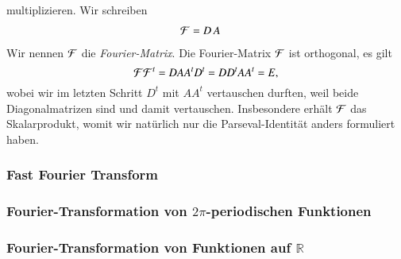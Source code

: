 multiplizieren.
Wir schreiben
\begin{align*}
{\cal F}
&=
D\, A
\end{align*}
Wir nennen $\cal F$ die {\em Fourier-Matrix}.
%
Die Fourier-Matrix $\cal F$ ist orthogonal, es gilt
\[
{\cal F}{\cal F}^t
=
DAA^tD^t
=
DD^tAA^t
=
E,
\]
wobei wir im letzten Schritt $D^t$ mit $AA^t$ vertauschen durften,
weil beide Diagonalmatrizen sind und damit vertauschen.
Insbesondere erhält $\cal F$ das Skalarprodukt, womit wir natürlich
nur die Parseval-Identität anders formuliert haben.



\subsubsection{Fast Fourier Transform}

\subsubsection{Fourier-Transformation von $2\pi$-periodischen Funktionen}

\subsubsection{Fourier-Transformation von Funktionen auf $\mathbb R$}






